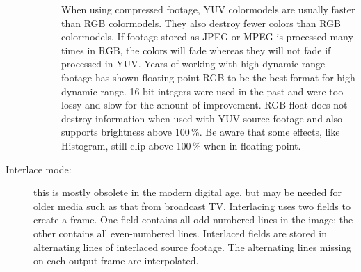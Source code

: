 \begin{description}
\begin{description}
                When using compressed footage, YUV colormodels are usually faster than RGB colormodels. 
                They also destroy fewer colors than RGB colormodels. 
                If footage stored as JPEG or MPEG is processed many times in RGB, the colors will fade whereas they will not fade if processed in YUV.  
                Years of working with high dynamic range footage has shown floating point RGB to be the best format for high dynamic range. 
                16 bit integers were used in the past and were too lossy and slow for the amount of improvement.  
                RGB float does not destroy information when used with YUV source footage and also supports brightness above 100\,\%. 
                Be aware that some effects, like Histogram, still clip above 100\,\% when in floating point.
        \end{description}
    \item[Interlace mode:]
        this is mostly obsolete in the modern digital age, but may be needed for older media such as that from broadcast TV.  Interlacing uses two fields to create a frame. One field contains all odd-numbered lines in the image; the other contains all even-numbered lines.  Interlaced fields are stored in alternating lines of interlaced source footage. The alternating lines missing on each output frame are interpolated.
\end{description}




